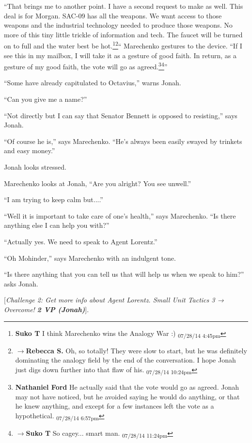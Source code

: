 ``That brings me to another point.  I have a second request to make as well.  This deal is for Morgan.  SAC-09 has all the weapons.  We want access to those weapons and the industrial technology needed to produce those weapons.  No more of this tiny little trickle of information and tech.  The faucet will be turned on to full and the water best be hot.\footnote{\textbf{Suko T }I think Marechenko wins the Analogy War :) \textsubscript{07/28/14 4:45pm}}\footnote{$\rightarrow$\textbf{Rebecca S. }Oh, so totally! They were slow to start, but he was definitely dominating the analogy field by the end of the conversation.  I hope Jonah just digs down further into that flaw of his. \textsubscript{07/28/14 10:24pm}}``  Marechenko gestures to the device.  ``If I see this in my mailbox, I will take it as a gesture of good faith.  In return, as a gesture of my good faith, the vote will go as agreed.\footnote{\textbf{Nathaniel Ford }He actually said that the vote would go as agreed. Jonah may not have noticed, but he avoided saying he would do anything, or that he knew anything, and except for a few instances left the vote as a hypothetical. \textsubscript{07/28/14 6:57pm}}\footnote{$\rightarrow$\textbf{Suko T }So cagey... smart man. \textsubscript{07/28/14 11:24pm}}''

``Some have already capitulated to Octavius,'' warns Jonah.

``Can you give me a name?''

``Not directly but I can say that Senator Bennett is opposed to resisting,'' says Jonah.  

``Of course he is,'' says Marechenko.  ``He's always been easily swayed by trinkets and easy money.''

Jonah looks stressed.

Marechenko looks at Jonah, ``Are you alright?  You see unwell.''

``I am trying to keep calm but....''

``Well it is important to take care of one's health,'' says Marechenko.  ``Is there anything else I can help you with?''

``Actually yes.  We need to speak to Agent Lorentz.''

``Oh Mohinder,'' says Marechenko with an indulgent tone.

``Is there anything that you can tell us that will help us when we speak to him?'' asks Jonah.

{[}\textit{Challenge 2: Get more info about Agent Lorentz.  Small Unit Tactics 3 → Overcome! }\textit{\textbf{2 VP (Jonah)}}{]}.  

